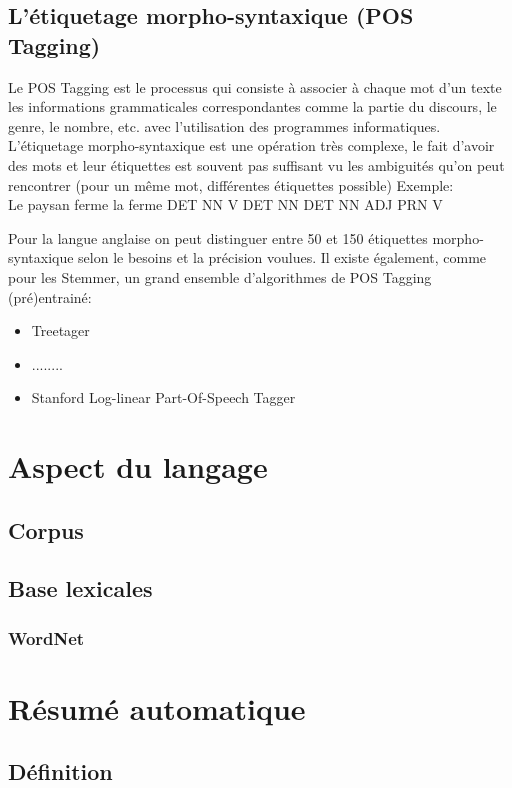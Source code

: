 \documentclass{report}
\begin{document}
\subsection{L'étiquetage morpho-syntaxique (POS Tagging)}
Le POS Tagging est le processus qui consiste à associer à chaque mot d'un texte les informations grammaticales correspondantes comme la partie du discours, le genre, le nombre, etc. avec l'utilisation des programmes informatiques.\\
L'étiquetage morpho-syntaxique est une opération très complexe, le fait d'avoir des mots et leur étiquettes est souvent pas suffisant vu les ambiguités qu'on peut rencontrer (pour un même mot, différentes étiquettes possible)
Exemple:\\
Le paysan ferme la ferme
DET NN V DET NN
DET NN ADJ PRN V

Pour la langue anglaise on peut distinguer entre 50 et 150 étiquettes morpho-syntaxique selon le besoins et la précision voulues.
Il existe également, comme pour les Stemmer, un grand ensemble d'algorithmes de POS Tagging (pré)entrainé:
\begin{itemize}
    \item Treetager
    \item ........
    \item Stanford Log-linear Part-Of-Speech Tagger
\end{itemize}

\section{Aspect du langage}
    \subsection{Corpus}

    \subsection{Base lexicales}
        \subsubsection{WordNet}


\section{Résumé automatique}
    \subsection{Définition}
\end{document}
